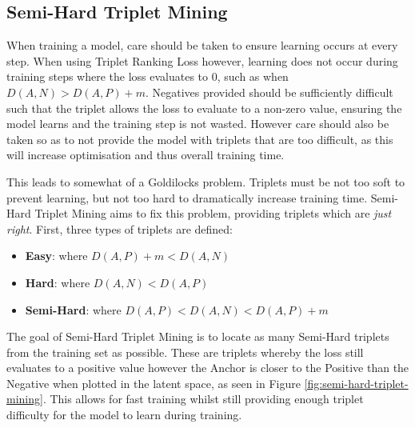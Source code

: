 \subsection{Semi-Hard Triplet Mining}\label{ch:ID,sec:SNNBackground,sub:SemiHardTripletMining}

When training a model, care should be taken to ensure learning occurs at every step. When using Triplet Ranking Loss however, learning does not occur during training steps where the loss evaluates to 0, such as when $D(A, N) > D(A, P) + m$. Negatives provided should be sufficiently difficult such that the triplet allows the loss to evaluate to a non-zero value, ensuring the model learns and the training step is not wasted. However care should also be taken so as to not provide the model with triplets that are too difficult, as this will increase optimisation and thus overall training time. 

This leads to somewhat of a Goldilocks problem. Triplets must be not too soft to prevent learning, but not too hard to dramatically increase training time. Semi-Hard Triplet Mining aims to fix this problem, providing triplets which are \textit{just right}. First, three types of triplets are defined:

\begin{itemize}
	\item \textbf{Easy}: where $D(A, P) + m < D(A, N)$
	\item \textbf{Hard}: where $D(A, N) < D(A, P)$
	\item \textbf{Semi-Hard}: where $D(A, P) < D(A, N) < D(A, P) + m$
\end{itemize}

The goal of Semi-Hard Triplet Mining is to locate as many Semi-Hard triplets from the training set as possible. These are triplets whereby the loss still evaluates to a positive value however the Anchor is closer to the Positive than the Negative when plotted in the latent space, as seen in Figure \ref{fig:semi-hard-triplet-mining}. This allows for fast training whilst still providing enough triplet difficulty for the model to learn during training. 

